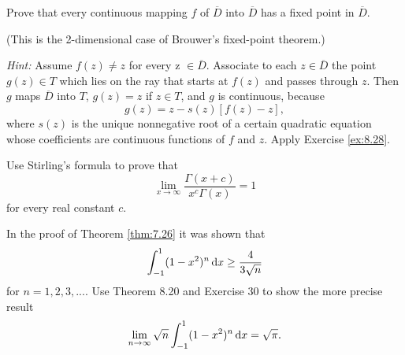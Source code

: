 \begin{myExercise}
    \label{ex:8.29}
    Prove that every continuous mapping $f$ of $\overline{D}$ into $\overline{D}$ has a fixed point in $\overline{D}$.
    
    (This is the 2-dimensional case of Brouwer's fixed-point theorem.)
    
    \emph{Hint:} Assume $f(z) \neq  z$ for every z $\in \overline{D}$. 
    Associate to each $z \in \overline{D}$ the point
    $g(z) \in T$ which lies on the ray that starts at $f(z)$ and passes through $z$. 
    Then $g$ maps $\overline{D}$ into $T$, $g(z) = z$ if $z \in T$, and $g$ is continuous, because
    \begin{equation*}
        g(z) = z - s(z)[f(z) - z],
    \end{equation*}
    where $s(z)$ is the unique nonnegative root of a certain quadratic equation whose coefficients are continuous functions of $f$ and $z$. 
    Apply Exercise \ref{ex:8.28}.
\end{myExercise}


\begin{myExercise}
    \label{ex:8.30}
    Use Stirling's formula to prove that
    \begin{equation*}
        \lim_{x \to \infty} \frac{\Gamma(x+c)}{x^c \Gamma(x)} = 1
    \end{equation*}
    for every real constant $c$.
\end{myExercise}


\begin{myExercise}
    \label{ex:8.31}
    In the proof of Theorem \ref{thm:7.26} it was shown that
    \begin{equation*}
        \int_{-1}^{1} (1-x^2)^n \d x \geq \frac{4}{3\sqrt{n}}
    \end{equation*}
    for $n = 1, 2, 3, ...$. Use Theorem 8.20 and Exercise 30 to show the more precise result
    \begin{equation*}
        \lim_{n \to \infty} \sqrt{n} \int_{-1}^{1} (1-x^2)^n \d x = \sqrt{\pi} .
    \end{equation*}
\end{myExercise}